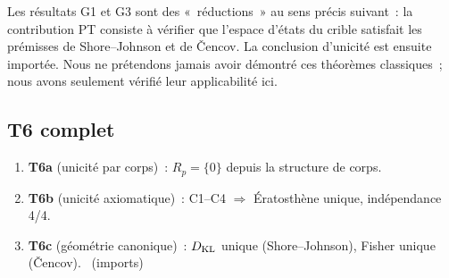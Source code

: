\documentclass[12pt,a4paper]{article}
\begin{document}
\begin{remarque}
Les résultats G1 et G3 sont des «~réductions~» au sens précis
suivant~: la contribution PT consiste à vérifier que l'espace d'états
du crible satisfait les prémisses de Shore--Johnson et de \v{C}encov.
La conclusion d'unicité est ensuite importée. Nous ne prétendons
jamais avoir démontré ces théorèmes classiques~; nous avons seulement
vérifié leur applicabilité ici.
\end{remarque}

\subsection{T6 complet}
\label{sec:T6_complete}

\begin{theoreme}
\label{thm:T6_complete}
\begin{enumerate}[nosep]
\item \textbf{T6a} (unicité par corps)~: $R_p = \{0\}$ depuis la
  structure de corps. \THMTAG
\item \textbf{T6b} (unicité axiomatique)~: C1--C4 $\Rightarrow$
  Ératosthène unique, indépendance 4/4. \THMTAG
\item \textbf{T6c} (géométrie canonique)~: $D_{\mathrm{KL}}$ unique
  (Shore--Johnson), Fisher unique (\v{C}encov). \THMTAG~(imports)
\end{enumerate}
\end{theoreme}
\end{document}

